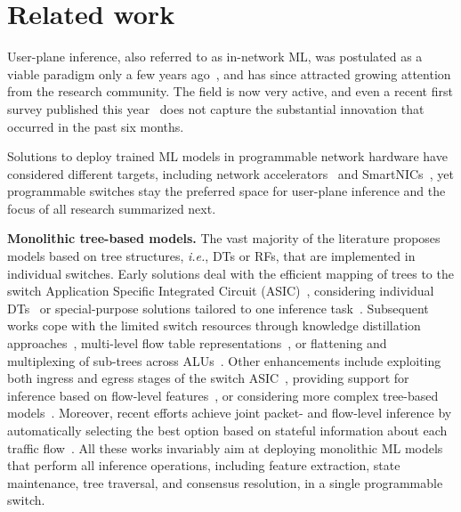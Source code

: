 \documentclass[journal]{IEEEtran}
\theoremstyle{plain} %
\newcommand{\ie}{\textit{i.e.},\xspace}
\newcommand{\td}[1]{\textcolor{red}{[TODO: #1]}}
\newcommand{\name}{\texttt{\fontsize{9}{11}\selectfont DUNE}\xspace}
\begin{document}


\section{Related work}
\label{sec:related}
User-plane inference, also referred to as in-network ML, was postulated as a viable paradigm only a few years ago~\cite{Amedeo.et.al.2017,siracusano_network_ai_acc,ilsy-hotnets19}, and has since attracted growing attention from the research community. The field is now very active, and even a recent first survey published this year~\cite{in-network-ml-survey} does not capture the substantial innovation that occurred in the past six months.

Solutions to deploy trained ML models in programmable network hardware have considered different targets, including network accelerators~\cite{Taurus.2022} and SmartNICs~\cite{N3IC.2022}, yet programmable switches stay the preferred space for user-plane inference and the focus of all research summarized next.

\noindent\textbf{Monolithic tree-based models.} The vast majority of the literature proposes models based on tree structures, \ie DTs or RFs, that are implemented in individual switches. Early solutions deal with the efficient mapping of trees to the switch Application Specific Integrated Circuit (ASIC)~\cite{pForest.2019,Planter.2021,SwitchTree.2020}, considering individual DTs~\cite{infocom2021-dt-ml,soter,netpixel,friday} or special-purpose solutions tailored to one inference task~\cite{pheavy-tnsm-2021,inc}. Subsequent works cope with the limited switch resources through knowledge distillation approaches~\cite{mousika-journal-ton23}, multi-level flow table representations~\cite{SentinelX}, %
or flattening and multiplexing of sub-trees across ALUs~\cite{Leo}.
Other enhancements include exploiting both ingress and egress stages of the switch ASIC~\cite{henna}, providing support for inference based on flow-level features~\cite{flowrest}, or considering more complex tree-based models~\cite{planter-journal-ccr24}. Moreover, recent efforts achieve joint packet- and flow-level inference by automatically selecting the best option based on stateful information about each traffic flow~\cite{jewel-infocom24,netbeacon}.
All these works invariably aim at deploying monolithic ML models that perform all inference operations, including feature extraction, state maintenance, tree traversal, and consensus resolution, in a single programmable switch.
\end{document}

